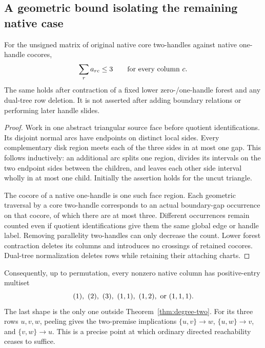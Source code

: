 \subsection{A geometric bound isolating the remaining native case}
\begin{proposition}\label{prop:three}
For the unsigned matrix of original native core two-handles against
native one-handle cocores,
\[
                         \sum_r a_{rc}\leq3
                    \qquad\hbox{for every column }c.
\]
The same holds after contraction of a fixed lower zero-/one-handle forest
and any dual-tree row deletion.  It is not asserted after adding boundary
relations or performing later handle slides.
\end{proposition}
\begin{proof}
Work in one abstract triangular source face before quotient identifications.
Its disjoint normal arcs have endpoints on distinct local sides.  Every
complementary disk region meets each of the three sides in at most one
gap.  This follows inductively: an additional arc splits one region,
divides its intervals on the two endpoint sides between the children,
and leaves each other side interval wholly in at most one child.
Initially the assertion holds for the uncut triangle.

The cocore of a native one-handle is one such face region.  Each geometric
traversal by a core two-handle corresponds to an actual boundary-gap
occurrence on that cocore, of which there are at most three.  Different
occurrences remain counted even if quotient identifications give them
the same global edge or handle label.  Removing parallelity two-handles
can only decrease the count.  Lower forest contraction deletes its
columns and introduces no crossings of retained cocores.  Dual-tree
normalization deletes rows while retaining their attaching charts.
\end{proof}

Consequently, up to permutation, every nonzero native column has
positive-entry multiset
\[
        (1),\ (2),\ (3),\ (1,1),\ (1,2),\ \hbox{or }(1,1,1).
\]
The last shape is the only one outside Theorem~\ref{thm:degree-two}.
For its three rows $u,v,w$, peeling gives the two-premise implications
$\{u,v\}\to w$, $\{u,w\}\to v$, and $\{v,w\}\to u$.
This is a precise point at which ordinary directed reachability ceases
to suffice.

